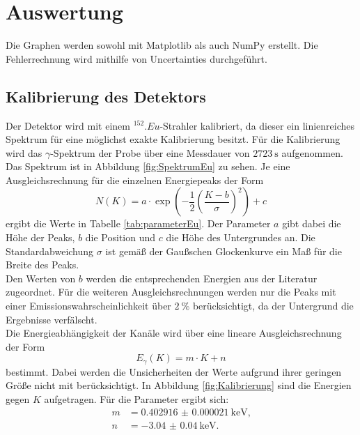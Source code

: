 \section{Auswertung}
\label{sec:Auswertung}

Die Graphen werden sowohl mit Matplotlib \cite{matplotlib} als auch NumPy \cite{numpy} erstellt. Die Fehlerrechnung wird mithilfe von Uncertainties \cite{uncertainties} durchgeführt.

\subsection{Kalibrierung des Detektors}

Der Detektor wird mit einem $^{152}.{Eu}$-Strahler kalibriert, da dieser ein linienreiches Spektrum für eine möglichst exakte Kalibrierung besitzt.
Für die Kalibrierung wird das $\gamma$-Spektrum der Probe über eine Messdauer von $\SI{2723}{\second}$ aufgenommen. Das Spektrum ist in Abbildung \ref{fig:SpektrumEu} zu sehen. Je eine Ausgleichsrechnung für die einzelnen Energiepeaks der Form
\begin{equation}
N(K)=a \cdot\exp\left(-\frac{1}{2}\left(\frac{K-b}{\sigma}\right)^2\right)+c \label{eq:gaussFit}
\end{equation}
ergibt die Werte in Tabelle \ref{tab:parameterEu}. Der Parameter $a$ gibt dabei die Höhe der Peaks, $b$ die Position und $c$ die Höhe des Untergrundes an. Die Standardabweichung $\sigma$ ist gemäß der Gaußschen Glockenkurve ein Maß für die Breite des Peaks.\\
Den Werten von $b$ werden die entsprechenden Energien aus der Literatur \cite{MARTIN20131497} zugeordnet.
Für die weiteren Ausgleichsrechnungen werden nur die Peaks mit einer Emissionswahrscheinlichkeit über $\SI{2}{\percent}$ berücksichtigt, da der Untergrund die Ergebnisse verfälscht.\\
Die Energieabhängigkeit der Kanäle wird über eine lineare Ausgleichsrechnung der Form
\[
E_\gamma(K) = m\cdot K+n
\]  
bestimmt. Dabei werden die Unsicherheiten der Werte aufgrund ihrer geringen Größe nicht mit berücksichtigt. In Abbildung \ref{fig:Kalibrierung} sind die Energien gegen $K$ aufgetragen.
Für die Parameter ergibt sich:
\begin{align*}
m	&=	\SI{0.402916(21)}{\kilo\electronvolt}\text{,}\\
n	&=	\SI{-3.04(4)}{\kilo\electronvolt}\text{.}
\end{align*}

